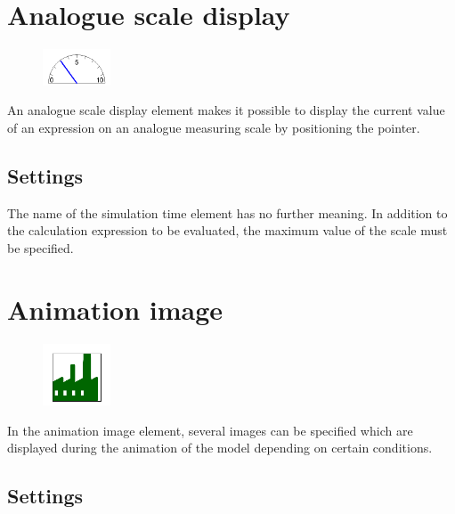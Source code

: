 \section{Analogue scale display}
\label{ref:ModelElementAnimationPointerMeasuring}

\begin{figure}
\vspace{-22pt}
\includegraphics[width=2cm]{imageModelElementAnimationPointerMeasuring.png}
\vspace{-22pt}
\end{figure}

An analogue scale display element makes it possible to display the current
value of an expression on an analogue measuring scale by positioning the pointer.

\subsection*{Settings}

The name of the simulation time element has no further meaning.
In addition to the calculation expression to be evaluated,
the maximum value of the scale must be specified.


\section{Animation image}
\label{ref:ModelElementAnimationImage}

\begin{figure}
\vspace{-22pt}
\includegraphics[width=2cm]{imageModelElementAnimationImage.png}
\vspace{-22pt}
\end{figure}

In the animation image element, several images can be specified
which are displayed during the animation of the model
depending on certain conditions.

\subsection*{Settings}

